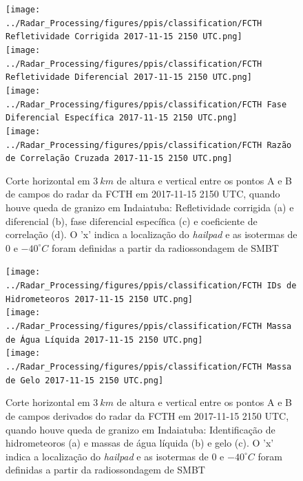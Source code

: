 \begin{figure}[hp]
	\centering
	\caption{Corte horizontal em $3\:km$ de altura e vertical entre os pontos A e B de campos do radar da FCTH em 2017-11-15 2150 UTC, quando houve queda de granizo em Indaiatuba: Refletividade corrigida (a) e diferencial (b), fase diferencial específica (c) e coeficiente de correlação (d). O 'x' indica a localização do \textit{hailpad} e as isotermas de $0$ e $-40^{\circ}C$ foram definidas a partir da radiossondagem de SMBT}
	\label{radar_20171115}
	\vspace{-5pt}
	\texttt{[image: ../Radar\_Processing/figures/ppis/classification/FCTH Refletividade Corrigida 2017-11-15 2150 UTC.png]} \\
	\vspace{-5pt}
	\texttt{[image: ../Radar\_Processing/figures/ppis/classification/FCTH Refletividade Diferencial 2017-11-15 2150 UTC.png]} \\
	\vspace{-5pt}
	\texttt{[image: ../Radar\_Processing/figures/ppis/classification/FCTH Fase Diferencial Específica 2017-11-15 2150 UTC.png]} \\
	\vspace{-5pt}
	\texttt{[image: ../Radar\_Processing/figures/ppis/classification/FCTH Razão de Correlação Cruzada 2017-11-15 2150 UTC.png]} \\
\end{figure}

\begin{figure}[htb]
	\centering
	\caption{Corte horizontal em $3\:km$ de altura e vertical entre os pontos A e B de campos derivados do radar da FCTH em 2017-11-15 2150 UTC, quando houve queda de granizo em Indaiatuba: Identificação de hidrometeoros (a) e massas de água líquida (b) e gelo (c). O 'x' indica a localização do \textit{hailpad} e as isotermas de $0$ e $-40^{\circ}C$ foram definidas a partir da radiossondagem de SMBT} 
	\label{radar_derived_20171115}
	\vspace{-5pt}
	\texttt{[image: ../Radar\_Processing/figures/ppis/classification/FCTH IDs de Hidrometeoros 2017-11-15 2150 UTC.png]} \\
	\vspace{-5pt}
	\texttt{[image: ../Radar\_Processing/figures/ppis/classification/FCTH Massa de Água Líquida 2017-11-15 2150 UTC.png]} \\
	\vspace{-5pt}
	\texttt{[image: ../Radar\_Processing/figures/ppis/classification/FCTH Massa de Gelo 2017-11-15 2150 UTC.png]} \\
\end{figure}

